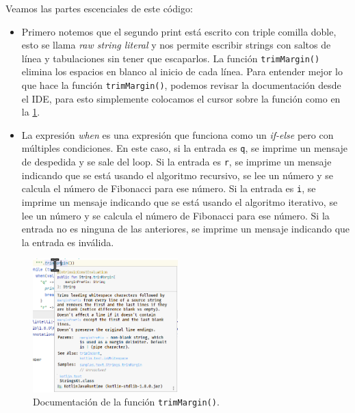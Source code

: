   Veamos las partes escenciales de este código:

  \begin{itemize}
    \item Primero notemos que el segundo print está escrito con triple comilla doble, esto se llama
      \textit{raw string literal} y nos permite escribir strings con saltos de línea y tabulaciones
      sin tener que escaparlos.
      La función \texttt{trimMargin()} elimina los espacios en blanco al inicio de cada línea.
      Para entender mejor lo que hace la función \texttt{trimMargin()}, podemos revisar la 
      documentación desde el IDE, para esto simplemente colocamos el cursor sobre la función como
      en la \cref{fig:trimMargin}.
    \item La expresión \textit{when} es una expresión que funciona como un \textit{if-else} pero con
      múltiples condiciones.
      En este caso, si la entrada es \texttt{q}, se imprime un mensaje de despedida y se sale del
      loop.
      Si la entrada es \texttt{r}, se imprime un mensaje indicando que se está usando el algoritmo
      recursivo, se lee un número y se calcula el número de Fibonacci para ese número.
      Si la entrada es \texttt{i}, se imprime un mensaje indicando que se está usando el algoritmo
      iterativo, se lee un número y se calcula el número de Fibonacci para ese número.
      Si la entrada no es ninguna de las anteriores, se imprime un mensaje indicando que la entrada
      es inválida.
  \end{itemize}

  \begin{figure}[ht!]
    \centering
    \includegraphics[width=0.5\textwidth]{img/Por_algo_se_empieza/trimMargin.png}
    \caption{Documentación de la función \texttt{trimMargin()}.}
    \label{fig:trimMargin}
  \end{figure}
